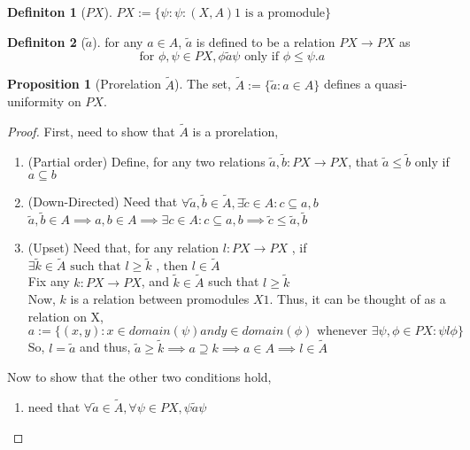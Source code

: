 \documentclass[18pt,a4paper]{article}
\makeatletter
\theoremstyle{definition}
\newtheorem{definition}{Definiton}[section]
\newtheorem{proop}{Proposition}[section]
\newcommand{\carrow}{}%
\DeclareRobustCommand{\carrow}{%
  \mathrel{\vphantom{\rightarrow}\mathpalette\circle@arrow\relax}%
}
\newcommand{\circle@arrow}[2]{%
  \m@th
  \ooalign{%
    \hidewidth$#1\circ\mkern1mu$\hidewidth\cr
    $#1\longrightarrow$\cr}%
}
\makeatother
\begin{document}
\begin{definition}[$PX$] %
$PX:=\{\psi : \psi:(X,A) \carrow 1 \text{ is a promodule} \}$
\end{definition}
\begin{definition}[$\tilde{a}$] %
	for any $a\in A$, $\tilde{a}$ is defined to be a relation $PX \to PX$ as
	\[ \text{ for } \phi,\psi \in PX, \phi \tilde{a} \psi \text{ only if } \phi \leq \psi.a \]
\end{definition}
\begin{proop}[Prorelation $\tilde{A}$] %
	The set, $\tilde{A}:=\{\tilde{a}:a \in A\}$ defines a quasi-uniformity on $PX$.
\end{proop}
\begin{proof}
	First, need to show that $\tilde{A}$ is a prorelation,
	\begin{enumerate}[label=(\roman*)]
		\item (Partial order) Define, for any two relations $\tilde{a},\tilde{b}:PX \to PX $,
			that $ \tilde{a} \leq \tilde{b}$ only if $a \subseteq b$
		\item(Down-Directed) Need that $\forall \tilde{a} ,\tilde{b} \in \tilde{A} ,
			\exists \tilde{c} \in A : c \subseteq a,b$\\
			$\tilde{a} ,\tilde{b} \in A \implies a,b \in A \implies \exists c \in A: c \subseteq
			a,b \implies \tilde{c} \leq \tilde{a} ,\tilde{b} $
		\item (Upset) Need that, for any relation $l:PX \to PX$ , if  $\exists \tilde{k} \in
			\tilde{A} \text{ such that }  l \geq \tilde{k} \text{ , then } l \in \tilde{A} $\\
			Fix any $k:PX \to PX$, and $\tilde{k} \in \tilde{A}$ such that $l\geq \tilde{k} $\\
			Now, $k$ is a relation between promodules $X \carrow 1$. Thus, it can be thought
			of as a relation on X,\\
			$a:=\{(x,y): x \in domain(\psi) and y \in domain(\phi)
			\text{ whenever } \exists \psi,\phi \in PX: \psi l \phi\}$ \\
			So, $l=\tilde{a}$ and thus, $\tilde{a} \geq \tilde{k} \implies a \supseteq k
			\implies a\in A \implies l \in \tilde{A} $
	\end{enumerate}
Now to show that the other two conditions hold,
\begin{enumerate}[label=(\roman*)]
	\item need that $\forall \tilde{a} \in \tilde{A} , \forall \psi \in PX, \psi \tilde{a} \psi$\\

\end{enumerate}
\end{proof}
\end{document}
